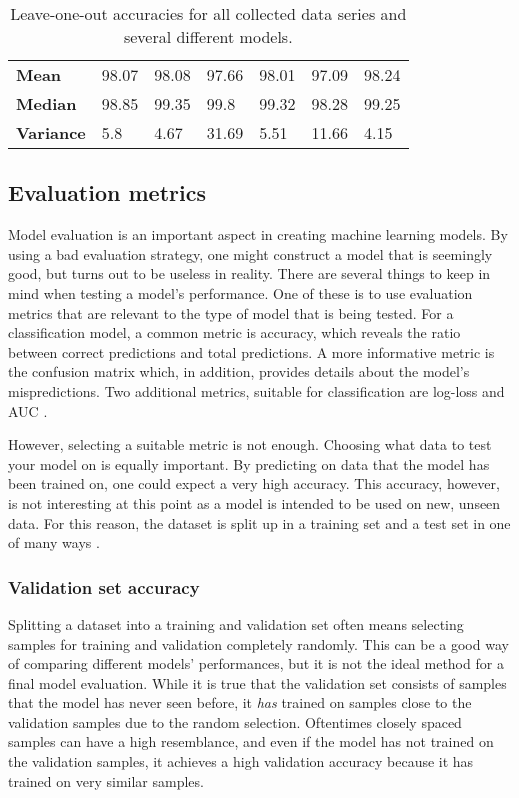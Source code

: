 \begin{table}
\begin{center}
\begin{adjustbox}{totalheight=\baselineskip}
\begin{tabular}{|l|l|l|l|l|l|l|}
		\hline
		\textbf{Mean} & 98.07 & 98.08 & 97.66 & 98.01 & 97.09 & \cellcolor{green!20}98.24\\
		\textbf{Median} & 98.85 & 99.35 & \cellcolor{green!20}99.8 & 99.32 & 98.28 & 99.25\\
		\textbf{Variance} & 5.8 & 4.67 & 31.69 & 5.51 & 11.66 & \cellcolor{green!20}4.15\\
		\hline
		\end{tabular}
\end{adjustbox}
	\end{center}
	\label{tab:loo}
	\caption{Leave-one-out accuracies for all collected data series and several different models.}
\end{table}

\subsection{Evaluation metrics}
Model evaluation is an important aspect in creating machine learning models. By using a bad evaluation strategy, one might construct a model that is seemingly good, but turns out to be useless in reality. There are several things to keep in mind when testing a model's performance. One of these is to use evaluation metrics that are relevant to the type of model that is being tested. For a classification model, a common metric is accuracy, which reveals the ratio between correct predictions and total predictions. A more informative metric is the confusion matrix which, in addition, provides details about the model's mispredictions. Two additional metrics, suitable for classification are log-loss and AUC \citep{zheng_2015}. 

However, selecting a suitable metric is not enough. Choosing what data to test your model on is equally important. By predicting on data that the model has been trained on, one could expect a very high accuracy. This accuracy, however, is not interesting at this point as a model is intended to be used on new, unseen data. For this reason, the dataset is split up in a training set and a test set in one of many ways \citep{raschka}.


\subsubsection{Validation set accuracy}
Splitting a dataset into a training and validation set often means selecting samples for training and validation completely randomly. This can be a good way of comparing different models' performances, but it is not the ideal method for a final model evaluation. While it is true that the validation set consists of samples that the model has never seen before, it \textit{has} trained on samples close to the validation samples due to the random selection. Oftentimes closely spaced samples can have a high resemblance, and even if the model has not trained on the validation samples, it achieves a high validation accuracy because it has trained on very similar samples.


